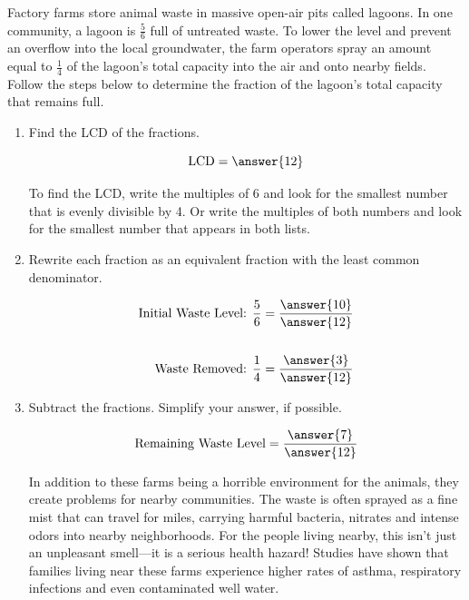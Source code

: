 \documentclass{ximera}
\begin{document}
\begin{problem}
Factory farms store animal waste in massive open-air pits called lagoons.  In one community, a lagoon is $\textstyle \frac{5}{6}$
full of untreated waste.  To lower the level and prevent an overflow into the local groundwater, the farm operators spray an amount
equal to $\textstyle \frac{1}{4}$ of the lagoon's total capacity into the air and onto nearby fields.  Follow the steps below
to determine the fraction of the lagoon's total capacity that remains full.

\begin{enumerate}
\item Find the LCD of the fractions.

\[ \textrm{LCD} = \answer{12} \]

\begin{hint}
To find the LCD, write the multiples of 6 and look for the smallest number that is evenly divisible by 4.  Or write the multiples of
both numbers and look for the smallest number that appears in both lists.
\end{hint}

\item Rewrite each fraction as an equivalent fraction with the least common denominator.

\begin{align*}
\text{Initial Waste Level: } \frac{5}{6} &= \frac{\answer{10}}{\answer{12}} \\
& \\
\text{Waste Removed: } \frac{1}{4} &= \frac{\answer{3}}{\answer{12}}
\end{align*}

\item Subtract the fractions.  Simplify your answer, if possible.

\[ \textrm{Remaining Waste Level}  = \frac{\answer{7}}{\answer{12}} \]

\begin{feedback}
In addition to these farms being a horrible environment for the animals, they create problems 
for nearby communities.  The waste is often sprayed as a fine mist that can travel for miles, carrying harmful 
bacteria, nitrates and intense odors into nearby neighborhoods.  For the people living nearby, this isn't just an 
unpleasant smell---it is a serious health hazard! Studies have shown that families living near these farms 
experience higher rates of asthma, respiratory infections and even contaminated well water.
\end{feedback}

\end{enumerate}

\end{problem}
\end{document}
